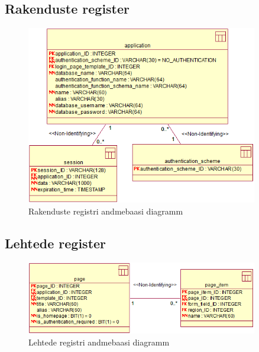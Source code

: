 \documentclass[a4paper,12pt]{article} %
\begin{document}
\subsection*{Rakenduste register}
\begin{figure}[H]
\centering
\includegraphics[width=0.9\textwidth]{./diagrams/applications-db-diagram.png}
\caption{Rakenduste registri andmebaasi diagramm}
\label{fig_rakenduste_registri_andmebaasi_diagramm}
\end{figure}

\subsection*{Lehtede register}
\begin{figure}[H]
\centering
\includegraphics[width=0.9\textwidth]{./diagrams/page-db-diagram.png}
\caption{Lehtede registri andmebaasi diagramm}
\label{fig_lehtede_registri_andmebaasi_diagramm}
\end{figure}
\end{document}
